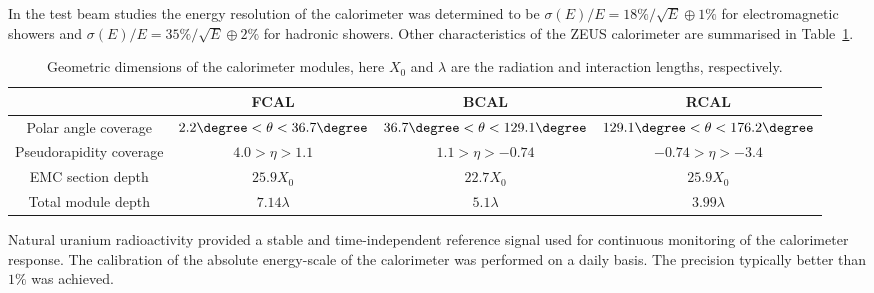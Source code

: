 In the test beam studies the energy resolution of the calorimeter was determined to be $\sigma\left( E \right ) / E = 18\%/\sqrt{E} \oplus 1\%$ for electromagnetic showers and $\sigma\left( E \right ) / E = 35\%/\sqrt{E} \oplus 2\%$ for hadronic showers. Other characteristics of the ZEUS calorimeter are summarised in Table~\ref{tab:calparams}.

\begin{table}[htbp]
	\centering
	{\small
		\begin{tabular}{|c|c|c|c|}
			     \hline
      &FCAL & BCAL & RCAL \\
			\hline
			\hline
			Polar angle coverage & $2.2\degree < \theta < 36.7\degree$ & $36.7\degree < \theta < 129.1\degree$ & $129.1\degree < \theta < 176.2\degree$ \\ \hline
			Pseudorapidity coverage & $4.0 > \eta > 1.1$ & $1.1 > \eta > -0.74$ & $-0.74 > \eta > -3.4$ \\ \hline
			EMC section depth & $25.9 X_0$ & $22.7 X_0$ & $25.9 X_0$ \\ \hline
			Total module depth & $7.14 \lambda$ & $5.1 \lambda$ & $3.99 \lambda$ \\ \hline		
		\end{tabular}
	}
	\caption{Geometric dimensions of the calorimeter modules, here $X_0$ and $\lambda$ are the radiation and interaction lengths, respectively.}
	\label{tab:calparams}
\end{table}

Natural uranium radioactivity provided a stable and time-independent reference signal used for continuous monitoring of the calorimeter response. The calibration of the absolute energy-scale of the calorimeter was performed on a daily basis. The precision typically better than $1\%$ was achieved.
